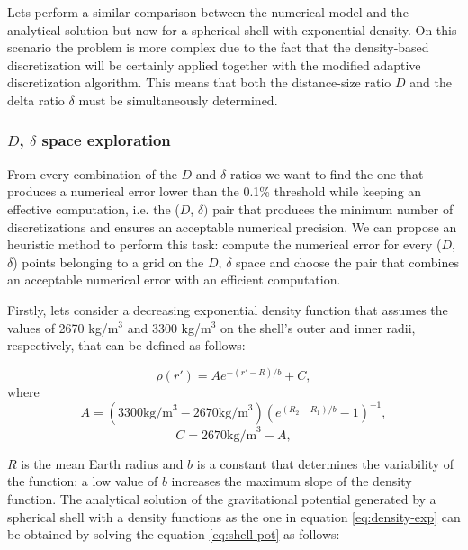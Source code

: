 \documentclass[extra]{gji}
\begin{document}
Lets perform a similar comparison between the numerical model and
the analytical solution but now for a spherical shell with exponential
density.
On this scenario the problem is more complex due to the fact that the
density-based discretization will be certainly applied together with
the modified adaptive discretization algorithm.
This means that both the distance-size ratio $D$ and the delta ratio
$\delta$ must be simultaneously determined.

\subsubsection{$D$, $\delta$ space exploration}

From every combination of the $D$ and $\delta$ ratios we want to find
the one that produces a numerical error lower than the 0.1\% threshold
while keeping an effective computation, i.e. the ($D$, $\delta)$ pair
that produces the minimum number of discretizations and ensures an
acceptable numerical precision.
We can propose an heuristic method to perform this task: compute the
numerical error for every ($D$, $\delta$) points belonging to a grid on
the $D$, $\delta$ space and choose the pair that combines an
acceptable numerical error with an efficient computation.

Firstly, lets consider a decreasing exponential density function that
assumes the values of 2670 kg/m$^3$ and 3300 kg/m$^3$ on the shell's
outer and inner radii, respectively, that can be defined as follows:

\begin{equation}
    \rho(r') = A e^{-(r' - R)/b} + C,
\label{eq:density-exp}
\end{equation}
\noindent where
\begin{equation}
    A =
    (3300 \text{kg/m}^3 - 2670 \text{kg/m}^3)
    \left( e^{( R_2 - R_1 )/b} - 1 \right)^{-1},
\end{equation}
\begin{equation}
    C =
    2670 \text{kg/m}^3 - A,
\end{equation}

\noindent $R$ is the mean Earth radius and $b$ is a constant
that determines the variability of the function: a low value of $b$
increases the maximum slope of the density function.
The analytical solution of the gravitational potential generated by a
spherical shell with a density functions as the one in equation
\ref{eq:density-exp} can be obtained by solving the equation
\ref{eq:shell-pot} as follows:
\end{document}
